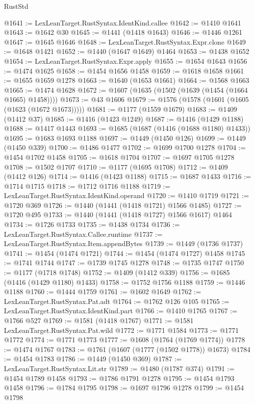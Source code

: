 \begin{lexlean}{RustStd}
\begin{coremodule}
@1641 := LexLeanTarget.RustSyntax.IdentKind.callee
@1642 := @1410 @1641
@1643 := @1642 @30
@1645 := @1441 (@1418 @1643)
@1646 := @1446 @1261
@1647 := @1645 @1646
@1648 := LexLeanTarget.RustSyntax.Expr.clone
@1649 := @1648 @1421
@1652 := @1440 (@1647 @1649) @1464
@1653 := @1438 @1652
@1654 := LexLeanTarget.RustSyntax.Expr.apply
@1655 := @1654 @1643
@1656 := @1474 @1625
@1658 := @1454 @1656 @1458
@1659 := @1618 @1658
@1661 := @1655 @1659 @1278
@1663 := @1640 (@1653 @1661)
@1664 := @1568 @1663
@1665 := @1474 @1628
@1672 := @1607 (@1635 (@1502 (@1639 (@1454 (@1664 @1665) @1458))))
@1673 := @43 @1606
@1679 := @1576 (@1578 (@1601 (@1605 (@1623 (@1672 @1673)))))
@1681 := @1177 (@1559 @1679)
@1683 := @1409 (@1412 @37)
@1685 := @1416 (@1423 @1249)
@1687 := @1416 (@1429 @1188)
@1688 := @1417 @1443
@1693 := @1685 (@1687 (@1416 (@1688 @1180) @1433))
@1695 := @1683 @1693 @1188
@1697 := @1449 (@1450 @126)
@1699 := @1449 (@1450 @339)
@1700 := @1486 @1477
@1702 := @1699 @1700 @1278
@1704 := @1454 @1702 @1458
@1705 := @1618 @1704
@1707 := @1697 @1705 @1278
@1708 := @1502 @1707
@1710 := @1177 (@1695 @1708)
@1712 := @1409 (@1412 @126)
@1714 := @1416 (@1423 @1188)
@1715 := @1687 @1433
@1716 := @1714 @1715
@1718 := @1712 @1716 @1188
@1719 := LexLeanTarget.RustSyntax.IdentKind.operand
@1720 := @1410 @1719
@1721 := @1720 @369
@1726 := @1440 (@1441 (@1418 @1721) @1566 @1485)
@1727 := @1720 @495
@1733 := @1440 (@1441 (@1418 @1727) @1566 @1617) @1464
@1734 := @1726 @1733
@1735 := @1438 @1734
@1736 := LexLeanTarget.RustSyntax.Callee.runtime
@1737 := LexLeanTarget.RustSyntax.Item.appendBytes
@1739 := @1449 (@1736 @1737)
@1741 := @1454 (@1474 @1721)
@1744 := @1454 (@1474 @1727) @1458
@1745 := @1741 @1744
@1747 := @1739 @1745 @1278
@1748 := @1735 @1747
@1750 := @1177 (@1718 @1748)
@1752 := @1409 (@1412 @339)
@1756 := @1685 (@1416 (@1429 @1180) @1433)
@1758 := @1752 @1756 @1188
@1759 := @1446 @1188
@1760 := @1444 @1759
@1761 := @1602 @1649
@1762 := LexLeanTarget.RustSyntax.Pat.adt
@1764 := @1762 @126 @105
@1765 := LexLeanTarget.RustSyntax.IdentKind.part
@1766 := @1410 @1765
@1767 := @1766 @527
@1769 := @1581 (@1418 @1767)
@1771 := @1581 LexLeanTarget.RustSyntax.Pat.wild
@1772 := @1771 @1584
@1773 := @1771 @1772
@1774 := @1771 @1773
@1777 := @1608 (@1764 (@1769 @1774))
@1778 := @1474 @1767
@1783 := @1761 (@1607 (@1777 (@1502 @1778)) @1673)
@1784 := @1454 @1783
@1786 := @1449 (@1450 @369)
@1787 := LexLeanTarget.RustSyntax.Lit.str
@1789 := @1480 (@1787 @374)
@1791 := @1454 @1789 @1458
@1793 := @1786 @1791 @1278
@1795 := @1454 @1793 @1458
@1796 := @1784 @1795
@1798 := @1697 @1796 @1278
@1799 := @1454 @1798

\end{coremodule}
\end{lexlean}

